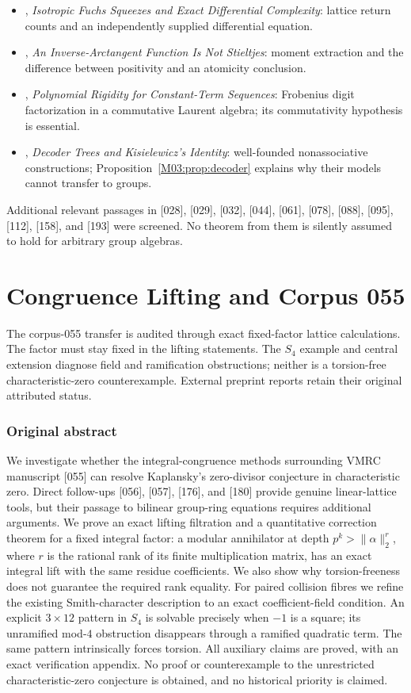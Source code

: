 \documentclass[11pt,a4paper,oneside]{report}
\theoremstyle{definition}
\theoremstyle{remark}
\newcommand{\compilationnote}[1]{\medskip\noindent{\small\color{accent}\textbf{Compilation note --- 23 November 2026.}}\par
{\small #1}\par\medskip}
\begin{document}
\begin{itemize}[itemsep=0.5pt,topsep=3pt]
\item [037], \emph{Isotropic Fuchs Squeezes and Exact Differential Complexity}: lattice return counts and an independently supplied differential equation.
\item [099], \emph{An Inverse-Arctangent Function Is Not Stieltjes}: moment extraction and the difference between positivity and an atomicity conclusion.
\item [178], \emph{Polynomial Rigidity for Constant-Term Sequences}: Frobenius digit factorization in a commutative Laurent algebra; its commutativity hypothesis is essential.
\item [085], \emph{Decoder Trees and Kisielewicz's Identity}: well-founded nonassociative constructions; Proposition~\ref{M03:prop:decoder} explains why their models cannot transfer to groups.
\end{itemize}
Additional relevant passages in [028], [029], [032], [044], [061], [078], [088], [095], [112], [158], and [193] were screened. No theorem from them is silently assumed to hold for arbitrary group algebras.



\chapter{Congruence Lifting and Corpus 055}\label{chap:M04}
\par
\compilationnote{The corpus-055 transfer is audited through exact fixed-factor lattice
calculations. The factor must stay fixed in the lifting statements.
The $S_4$ example and central extension diagnose field and ramification
obstructions; neither is a torsion-free characteristic-zero counterexample.
External preprint reports retain their original attributed status.}
\subsection*{Original abstract}
We investigate whether the integral-congruence methods surrounding VMRC
manuscript [055] can resolve Kaplansky's zero-divisor conjecture in
characteristic zero. Direct follow-ups [056], [057], [176], and [180]
provide genuine linear-lattice tools, but their passage to bilinear
group-ring equations requires additional arguments. We prove an exact
lifting filtration and a quantitative correction theorem for a fixed
integral factor: a modular annihilator at depth $p^k>\|\alpha\|_2^r$,
where $r$ is the rational rank of its finite multiplication matrix,
has an exact integral lift with the same residue coefficients. We also
show why torsion-freeness does not guarantee the required rank equality.
For paired collision fibres we refine the existing Smith-character
description to an exact coefficient-field condition. An explicit
$3\times12$ pattern in $S_4$ is solvable precisely when $-1$ is a square;
its unramified mod-$4$ obstruction disappears through a ramified
quadratic term. The same pattern intrinsically forces torsion.
All auxiliary claims are proved, with an exact verification appendix.
No proof or counterexample to the unrestricted characteristic-zero
conjecture is obtained, and no historical priority is claimed.
\medskip
\end{document}

